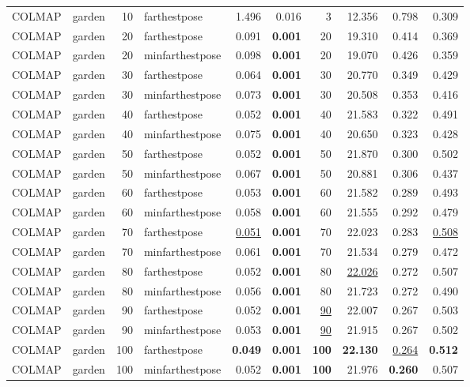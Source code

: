 \begin{table}[H]
\begin{tabular}{llrlrrrrrr}
\midrule
COLMAP & garden & 10 & farthestpose & 1.496 & 0.016 & 3 & 12.356 & 0.798 & 0.309 \\
COLMAP & garden & 20 & farthestpose & 0.091 & \textbf{0.001} & 20 & 19.310 & 0.414 & 0.369 \\
COLMAP & garden & 20 & minfarthestpose & 0.098 & \textbf{0.001} & 20 & 19.070 & 0.426 & 0.359 \\
COLMAP & garden & 30 & farthestpose & 0.064 & \textbf{0.001} & 30 & 20.770 & 0.349 & 0.429 \\
COLMAP & garden & 30 & minfarthestpose & 0.073 & \textbf{0.001} & 30 & 20.508 & 0.353 & 0.416 \\
COLMAP & garden & 40 & farthestpose & 0.052 & \textbf{0.001} & 40 & 21.583 & 0.322 & 0.491 \\
COLMAP & garden & 40 & minfarthestpose & 0.075 & \textbf{0.001} & 40 & 20.650 & 0.323 & 0.428 \\
COLMAP & garden & 50 & farthestpose & 0.052 & \textbf{0.001} & 50 & 21.870 & 0.300 & 0.502 \\
COLMAP & garden & 50 & minfarthestpose & 0.067 & \textbf{0.001} & 50 & 20.881 & 0.306 & 0.437 \\
COLMAP & garden & 60 & farthestpose & 0.053 & \textbf{0.001} & 60 & 21.582 & 0.289 & 0.493 \\
COLMAP & garden & 60 & minfarthestpose & 0.058 & \textbf{0.001} & 60 & 21.555 & 0.292 & 0.479 \\
COLMAP & garden & 70 & farthestpose & \underline{0.051} & \textbf{0.001} & 70 & 22.023 & 0.283 & \underline{0.508} \\
COLMAP & garden & 70 & minfarthestpose & 0.061 & \textbf{0.001} & 70 & 21.534 & 0.279 & 0.472 \\
COLMAP & garden & 80 & farthestpose & 0.052 & \textbf{0.001} & 80 & \underline{22.026} & 0.272 & 0.507 \\
COLMAP & garden & 80 & minfarthestpose & 0.056 & \textbf{0.001} & 80 & 21.723 & 0.272 & 0.490 \\
COLMAP & garden & 90 & farthestpose & 0.052 & \textbf{0.001} & \underline{90} & 22.007 & 0.267 & 0.503 \\
COLMAP & garden & 90 & minfarthestpose & 0.053 & \textbf{0.001} & \underline{90} & 21.915 & 0.267 & 0.502 \\
COLMAP & garden & 100 & farthestpose & \textbf{0.049} & \textbf{0.001} & \textbf{100} & \textbf{22.130} & \underline{0.264} & \textbf{0.512} \\
COLMAP & garden & 100 & minfarthestpose & 0.052 & \textbf{0.001} & \textbf{100} & 21.976 & \textbf{0.260} & 0.507 \\

\end{tabular}
\end{table}
